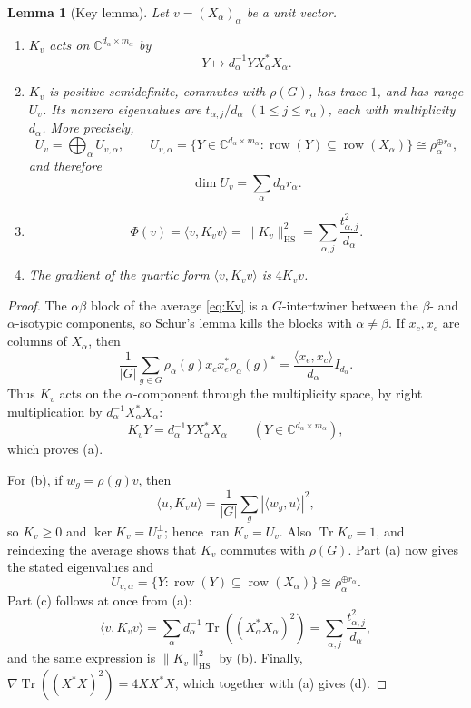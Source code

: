 \documentclass{amsart}
\newtheorem{lemma}[theorem]{Lemma}
\theoremstyle{remark}
\DeclareMathOperator{\Tr}{Tr}
\DeclareMathOperator{\row}{row}
\newcommand{\C}{\mathbb C}
\newcommand{\norm}[1]{\lVert #1\rVert}
\begin{document}
\begin{lemma}[Key lemma]\label{lem:key}
Let $v=(X_\alpha)_\alpha$ be a unit vector.
\begin{enumerate}[label=\textup{(\alph*)}]
\item $K_v$ acts on $\C^{d_\alpha\times m_\alpha}$ by
\[
 Y\longmapsto d_\alpha^{-1}YX_\alpha^*X_\alpha.
\]
\item $K_v$ is positive semidefinite, commutes with $\rho(G)$, has trace $1$, and has range $U_v$.
Its nonzero eigenvalues are $t_{\alpha,j}/d_\alpha$ $(1\le j\le r_\alpha)$, each with multiplicity
$d_\alpha$. More precisely,
\[
 U_v=\bigoplus_\alpha U_{v,\alpha},\qquad
 U_{v,\alpha}
 =\{Y\in\C^{d_\alpha\times m_\alpha}:\row(Y)\subseteq\row(X_\alpha)\}
 \cong \rho_\alpha^{\oplus r_\alpha},
\]
and therefore
\[
 \dim U_v=\sum_\alpha d_\alpha r_\alpha.
\]
\item
\[
 \Phi(v)=\langle v,K_vv\rangle=\norm{K_v}_{\mathrm{HS}}^2
 =\sum_{\alpha,j}\frac{t_{\alpha,j}^2}{d_\alpha}.
\]
\item The gradient of the quartic form $\langle v,K_vv\rangle$ is $4K_vv$.
\end{enumerate}
\end{lemma}
 
\begin{proof}
The $\alpha\beta$ block of the average \eqref{eq:Kv} is a $G$-intertwiner between the
$\beta$- and $\alpha$-isotypic components, so Schur's lemma kills the blocks with
$\alpha\ne\beta$. If $x_c,x_e$ are columns of $X_\alpha$, then
\[
 \frac1{|G|}\sum_{g\in G}
 \rho_\alpha(g)x_cx_e^*\rho_\alpha(g)^*
 =\frac{\langle x_e,x_c\rangle}{d_\alpha}I_{d_\alpha}.
\]
Thus $K_v$ acts on the $\alpha$-component through the multiplicity space, by right multiplication
by $d_\alpha^{-1}X_\alpha^*X_\alpha$:
\[
 K_vY=d_\alpha^{-1}YX_\alpha^*X_\alpha
 \qquad(Y\in\C^{d_\alpha\times m_\alpha}),
\]
which proves (a).
 
For (b), if $w_g=\rho(g)v$, then
\[
 \langle u,K_vu\rangle=\frac1{|G|}\sum_g|\langle w_g,u\rangle|^2,
\]
so $K_v\ge0$ and $\ker K_v=U_v^\perp$; hence $\operatorname{ran}K_v=U_v$. Also
$\Tr K_v=1$, and reindexing the average shows that $K_v$ commutes with $\rho(G)$. Part (a) now gives the
stated eigenvalues and
\[
 U_{v,\alpha}=\{Y:\row(Y)\subseteq\row(X_\alpha)\}
 \cong\rho_\alpha^{\oplus r_\alpha}.
\]
Part (c) follows at once from (a):
\[
 \langle v,K_vv\rangle
 =\sum_\alpha d_\alpha^{-1}\Tr((X_\alpha^*X_\alpha)^2)
 =\sum_{\alpha,j}\frac{t_{\alpha,j}^2}{d_\alpha},
\]
and the same expression is $\norm{K_v}_{\mathrm{HS}}^2$ by (b). Finally,
$\nabla\Tr((X^*X)^2)=4XX^*X$, which together with (a) gives (d).
\end{proof}
\end{document}
